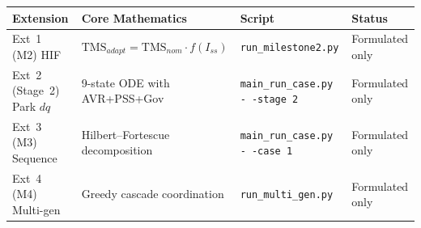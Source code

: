\documentclass[12pt,a4paper]{article}
\begin{document}
\begin{center}
\begin{tabular}{p{3cm}p{4cm}p{3.5cm}p{2.5cm}}
\toprule
\textbf{Extension} & \textbf{Core Mathematics} & \textbf{Script} & \textbf{Status} \\
\midrule
Ext~1 (M2) HIF & $\text{TMS}_{adapt} = \text{TMS}_{nom} \cdot f(I_{ss})$ &
  \texttt{run\_milestone2.py} & Formulated only \\
\midrule
Ext~2 (Stage~2) Park $dq$ & 9-state ODE with AVR+PSS+Gov &
  \texttt{main\_run\_case.py \texttt{-\,-}stage 2} & Formulated only \\
\midrule
Ext~3 (M3) Sequence & Hilbert--Fortescue decomposition &
  \texttt{main\_run\_case.py \texttt{-\,-}case 1} & Formulated only \\
\midrule
Ext~4 (M4) Multi-gen & Greedy cascade coordination &
  \texttt{run\_multi\_gen.py} & Formulated only \\
\bottomrule
\end{tabular}
\end{center}
\end{document}
